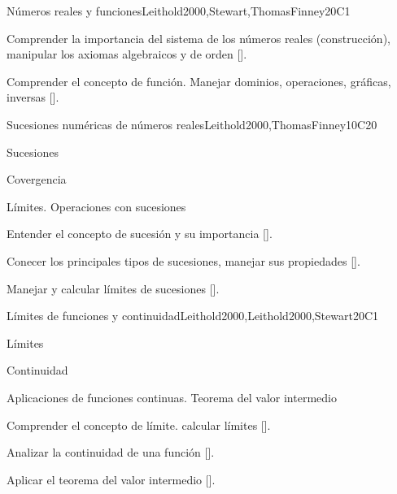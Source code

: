 \begin{syllabus}
\begin{unit}{}{Números reales y funciones}{Leithold2000,Stewart,ThomasFinney}{20}{C1}
   \begin{learningoutcomes}
      \item Comprender la importancia del sistema de los números reales (construcción), manipular los axiomas algebraicos y de orden [\Assessment].
      \item Comprender el concepto de función. Manejar dominios, operaciones, gráficas, inversas [\Assessment].
      \end{learningoutcomes}
\end{unit}

\begin{unit}{}{Sucesiones numéricas de números reales}{Leithold2000,ThomasFinney}{10}{C20}
   \begin{topics}
      \item Sucesiones
      \item Covergencia
      \item Límites. Operaciones con sucesiones
   \end{topics}

   \begin{learningoutcomes}
      \item Entender el concepto de sucesión y su importancia [\Assessment].
      \item Conecer los principales tipos de sucesiones, manejar sus propiedades [\Assessment].
      \item Manejar y calcular límites de sucesiones [\Assessment].
      \end{learningoutcomes}
\end{unit}

\begin{unit}{}{Límites de funciones y continuidad}{Leithold2000,Leithold2000,Stewart}{20}{C1}
   \begin{topics}
      \item Límites
      \item Continuidad
      \item Aplicaciones de funciones continuas. Teorema del valor intermedio
   \end{topics}

   \begin{learningoutcomes}
      \item Comprender el concepto de límite. calcular límites [\Assessment].
      \item Analizar la continuidad de una función [\Assessment].
      \item Aplicar el teorema del valor intermedio [\Assessment].
      \end{learningoutcomes}
\end{unit}


\end{syllabus}
